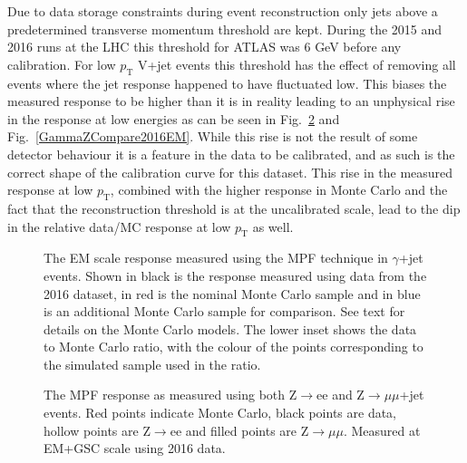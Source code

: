 Due to data storage constraints during event reconstruction only jets above a predetermined transverse momentum threshold are kept.  
During the 2015 and 2016 runs at the LHC this threshold for ATLAS was 6 GeV before any calibration.  
For low $p_{\mathrm T}$ V+jet events this threshold has the effect of removing all events where the jet response happened to have fluctuated low.  
This biases the measured response to be higher than it is in reality leading to an unphysical rise in the response at low energies as can be seen in Fig.~\ref{eemumuCompare2016EM} and Fig.~\ref{GammaZCompare2016EM}.  
While this rise is not the result of some detector behaviour it is a feature in the data to be calibrated, and as such is the correct shape of the calibration curve for this dataset.  
This rise in the measured response at low $p_{\mathrm T}$, combined with the higher response in Monte Carlo and the fact that the reconstruction threshold is at the uncalibrated scale, lead to the dip in the relative data/MC response at low $p_{\mathrm T}$ as well.  


\begin{figure}[!ht]
 \begin{center}
 \end{center}
 \caption[EM scale response using $\gamma$+jet in 2016]
 {\small The EM scale response measured using the MPF technique in $\gamma$+jet events.  Shown in black is the response measured using data from the 2016 dataset, in red is the nominal Monte Carlo sample and in blue is an additional Monte Carlo sample for comparison.  See text for details on the Monte Carlo models.  The lower inset shows the data to Monte Carlo ratio, with the colour of the points corresponding to the simulated sample used in the ratio.  }
 \label{Fig:GammaJetEM2016}
\end{figure}


\begin{figure}[!ht]
\begin{center}
\end{center}
\caption[Comparing EM scale response between Z$\rightarrow$ee and Z$\rightarrow\mu\mu$]
{\small The MPF response as measured using both Z$\rightarrow$ee and Z$\rightarrow\mu\mu$+jet events.  Red points indicate Monte Carlo, black points are data, hollow points are Z$\rightarrow$ee and filled points are Z$\rightarrow\mu\mu$.  Measured at EM+GSC scale using 2016 data.  }
\label{eemumuCompare2016EM}
\end{figure}

